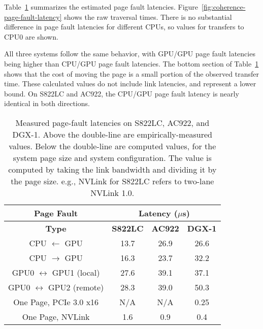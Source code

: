 Table~\ref{tab:page-fault-latency} summarizes the estimated page fault latencies.
Figure~\ref{fig:coherence-page-fault-latency} shows the raw traversal times.
There is no substantial difference in page fault latencies for different CPUs, so values for transfers to CPU0 are shown.

All three systems follow the same behavior, with GPU/GPU page fault latencies being higher than CPU/GPU page fault latencies.
The bottom section of Table~\ref{tab:page-fault-latency} shows that the cost of moving the page is a small portion of the observed transfer time.
These calculated values do not include link latencies, and represent a lower bound.
On S822LC and AC922, the CPU/GPU page fault latency is nearly identical in both directions.


\begin{table}[ht]
	\centering
	\caption[Page Fault Latencies]{
        Measured page-fault latencies on S822LC, AC922, and DGX-1.
        Above the double-line are empirically-measured values.
        Below the double-line are computed values, for the system page size and system configuration.
        The value is computed by taking the link bandwidth and dividing it by the page size.
        e.g., NVLink for S822LC refers to two-lane NVLink 1.0.
    }
	\label{tab:page-fault-latency}
	\begin{tabular}{cccc}
        \hline
        \textbf{Page Fault}                  & \multicolumn{3}{c|}{\textbf{Latency ($\mu$s)}}    \\ \hline
		\textbf{Type}                        & \textbf{S822LC} & \textbf{AC922} & \textbf{DGX-1} \\ \hline
		CPU  $\leftarrow$  GPU               & 13.7            & 26.9           & 26.6           \\ \hline
		CPU  $\rightarrow$ GPU               & 16.3            & 23.7           & 32.2           \\ \hline
		GPU0 $\leftrightarrow$ GPU1 (local)  & 27.6            & 39.1           & 37.1           \\ \hline
        GPU0 $\leftrightarrow$ GPU2 (remote) & 28.3            & 39.0           & 50.3           \\ \hline
        \hline
        One Page, PCIe 3.0 x16               & N/A             & N/A            & 0.25           \\ \hline
        One Page, NVLink                     & 1.6             & 0.9            & 0.4            \\ \hline
	\end{tabular}
\end{table}



